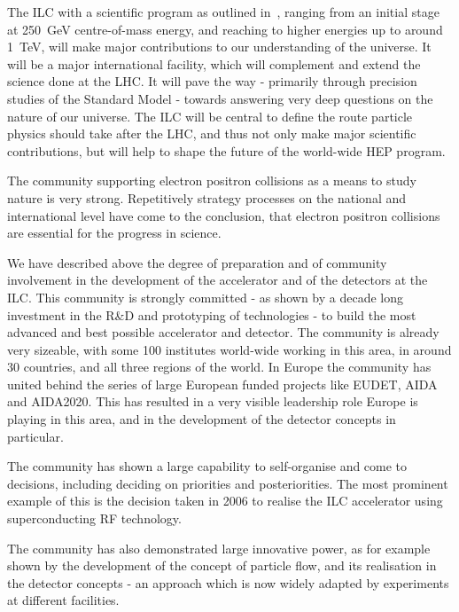 \documentclass[%
 reprint,
 floatfix,
 amsmath,amssymb,
 aps,
]{revtex4-1}
\begin{document}



The ILC with a scientific program as outlined in~\cite{ILCESU1}, ranging from 
an initial stage at 250~GeV centre-of-mass energy, and reaching to higher 
energies up to around 1~TeV, will make major contributions to our understanding 
of the universe. It will be a major international facility, which will 
complement and extend the science done at the LHC. It will pave the way - 
primarily through precision studies of the Standard Model - towards answering 
very deep questions on the nature of our universe. The ILC will be central to 
define the route particle physics should take after the LHC, and thus not only 
make major scientific contributions, but will help to shape the future of the 
world-wide HEP program. 

The community supporting electron positron collisions as a means to study nature 
is very strong. Repetitively strategy processes on the national and 
international level have come to the conclusion, that electron positron 
collisions are essential for the progress in science. 

We have described above the degree of preparation and of community involvement 
in the development of the accelerator and of the detectors at the ILC. This 
community is strongly committed - as shown by a decade long investment in the 
R\&D and prototyping of technologies - to build the most advanced and best 
possible accelerator and detector. The community is already very sizeable, with 
some 100 institutes world-wide working in this area, in around 30 countries, and 
all three regions of the world. In Europe the community has united behind the 
series of large European funded projects like EUDET, AIDA and AIDA2020. This has 
resulted in a very visible leadership role Europe is playing in this area, and 
in the development of the detector concepts in particular. 

The community has shown a large capability to self-organise and come to 
decisions, including deciding on priorities and posteriorities. The most 
prominent example of this is the decision taken in 2006 to realise the ILC 
accelerator using superconducting RF technology. 

The community has also demonstrated large innovative power, as for example shown 
by the development of the concept of particle flow, and its realisation in the 
detector concepts - an approach which is now widely adapted by experiments at 
different facilities. 
\end{document}
